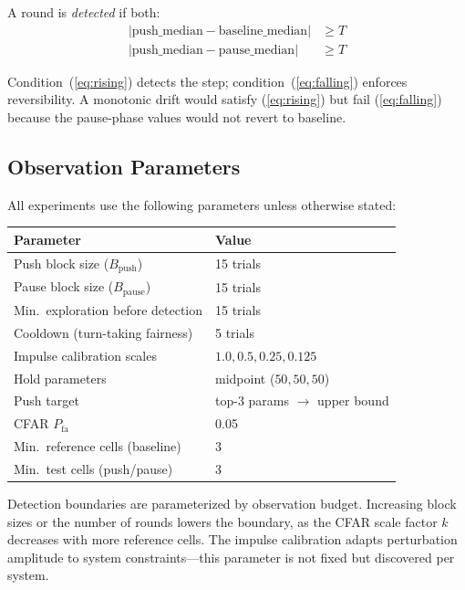 A round is \emph{detected} if both:
\begin{align}
  |\text{push\_median} - \text{baseline\_median}| &\geq T \label{eq:rising} \\
  |\text{push\_median} - \text{pause\_median}| &\geq T \label{eq:falling}
\end{align}

Condition~(\ref{eq:rising}) detects the step; condition~(\ref{eq:falling})
enforces reversibility. A monotonic drift would satisfy
(\ref{eq:rising}) but fail (\ref{eq:falling}) because the pause-phase
values would not revert to baseline.

\subsection{Observation Parameters}
\label{sec:obs-params}

All experiments use the following parameters unless otherwise stated:

\begin{center}
\begin{tabular}{ll}
  \toprule
  Parameter & Value \\
  \midrule
  Push block size ($B_{\text{push}}$) & 15 trials \\
  Pause block size ($B_{\text{pause}}$) & 15 trials \\
  Min.\ exploration before detection & 15 trials \\
  Cooldown (turn-taking fairness) & 5 trials \\
  Impulse calibration scales & $1.0, 0.5, 0.25, 0.125$ \\
  Hold parameters & midpoint ($50, 50, 50$) \\
  Push target & top-3 params $\to$ upper bound \\
  CFAR $P_{\text{fa}}$ & 0.05 \\
  Min.\ reference cells (baseline) & 3 \\
  Min.\ test cells (push/pause) & 3 \\
  \bottomrule
\end{tabular}
\end{center}

Detection boundaries are parameterized by observation budget.
Increasing block sizes or the number of rounds lowers the boundary,
as the CFAR scale factor $k$ decreases with more reference cells.
The impulse calibration adapts perturbation amplitude to system
constraints---this parameter is not fixed but discovered per system.
